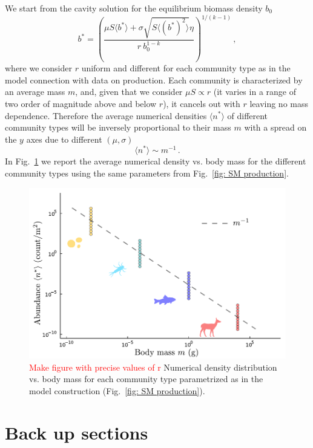 \documentclass[10pt]{article}
\begin{document}
We start from the cavity solution for the equilibrium biomass density $b_0$
\begin{equation}
    b^* = \left(\frac{\mu S \langle b^* \rangle + \sigma \sqrt{S\langle (b^*)^2\rangle} \eta}
    {r \ b_0^{1-k}}\right)^{1/(k-1)} \, ,
\end{equation}
where we consider $r$ uniform and different for each community type as in the model
connection with data on production.
Each community is characterized by an average mass $m$, and, given that we consider
$\mu S \propto r$ (it varies in a range of two order of magnitude above and below $r$),
it cancels out with $r$ leaving no mass dependence.
Therefore the average numerical densities $\langle n^*\rangle$ 
of different community types will
be inversely proportional to their mass $m$ with a spread on the $y$ axes
due to different $(\mu, \sigma)$
\begin{equation}
    \langle n^*\rangle \sim m^{-1} \, .
\end{equation}
In Fig.~\ref{fig: SM size-density scaling} we report the average numerical density vs. 
body mass for the different community types using the same 
parameters from Fig.~\ref{fig: SM production}.

\begin{figure}[h!]
    \centering
    \includegraphics[width=.8\textwidth]{fig/SM-size-density-scaling.pdf}
    \caption{\textcolor{red}{Make figure with precise values of r} Numerical density distribution vs. body mass for each community 
     type parametrized as in the model construction (Fig.~\ref{fig: SM production}).}
    \label{fig: SM size-density scaling}
\end{figure}

\newpage

\section{Back up sections}
\end{document}
